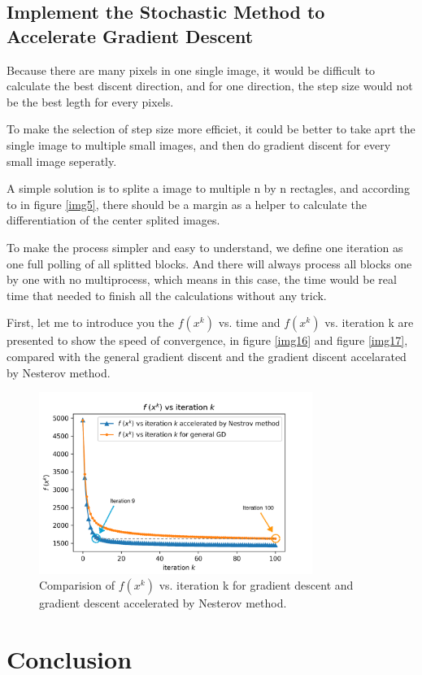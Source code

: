 \documentclass{article}
\begin{document}
\subsection{Implement the Stochastic Method to Accelerate Gradient Descent}

Because there are many pixels in one single image, it would be difficult to calculate the best discent direction, and for one direction, the step size would not be the best legth for every pixels.

To make the selection of step size more efficiet, it could be better to take aprt the single image to multiple small images, and then do gradient discent for every small image seperatly.

A simple solution is to splite a image to multiple n by n rectagles, and according to in figure \ref{img5}, there should be a margin as a helper to calculate the differentiation of the center splited images. 

To make the process simpler and easy to understand, we define one iteration as one full polling of all splitted blocks. And there will always process all blocks one by one with no multiprocess, which means in this case, the time would be real time that needed to finish all the calculations without any trick.

First, let me to introduce you the $f(x^{k})$ vs. time and  $f(x^{k})$ vs. iteration k are presented to show the speed of convergence, in figure \ref{img16} and figure \ref{img17}, compared with the general gradient discent and the gradient discent accelarated by Nesterov method.

\begin{figure}[h]
  \includegraphics[width=3.5in]{pic15.png}
  \centering
  \caption{Comparision of $f(x^{k})$ vs. iteration k for gradient descent and gradient descent accelerated by Nesterov method.}
  \label{img15}
\end{figure}


\section{Conclusion}




\end{document}
